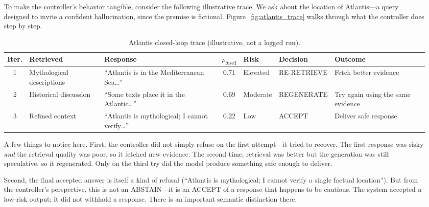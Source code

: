 To make the controller's behavior tangible, consider the following illustrative trace. We ask about the location of Atlantis—a query designed to invite a confident hallucination, since the premise is fictional. Figure~\ref{fig:atlantis_trace} walks through what the controller does step by step.

\begin{table}[!htb]
\centering
\caption{Atlantis closed-loop trace (illustrative, not a logged run).}
\label{tab:atlantis_trace}
\footnotesize
\renewcommand{\arraystretch}{1.35}
\setlength{\tabcolsep}{3.5pt}

\begin{tabularx}{\textwidth}{@{}c p{2.0cm} X c p{1.3cm} p{1.8cm} X@{}}
\toprule
\textbf{Iter.} & \textbf{Retrieved} & \textbf{Response} & $p_{\text{fused}}$ & \textbf{Risk} & \textbf{Decision} & \textbf{Outcome} \\
\midrule

1 & Mythological descriptions 
& ``Atlantis is in the Mediterranean Sea\ldots'' 
& 0.71 
& Elevated 
& RE-RETRIEVE 
& Fetch better evidence \\

2 & Historical discussion 
& ``Some texts place it in the Atlantic\ldots'' 
& 0.69 
& Moderate 
& REGENERATE 
& Try again using the same evidence \\

3 & Refined context 
& ``Atlantis is mythological; I cannot verify\ldots'' 
& 0.22 
& Low 
& ACCEPT 
& Deliver safe response \\

\bottomrule
\end{tabularx}
\end{table}

A few things to notice here. First, the controller did not simply refuse on the first attempt—it tried to recover. The first response was risky \emph{and} the retrieval quality was poor, so it fetched new evidence. The second time, retrieval was better but the generation was still speculative, so it regenerated. Only on the third try did the model produce something safe enough to deliver.

Second, the final accepted answer is itself a kind of refusal (``Atlantis is mythological; I cannot verify a single factual location''). But from the controller's perspective, this is not an ABSTAIN—it is an ACCEPT of a response that happens to be cautious. The system accepted a low-risk output; it did not withhold a response. There is an important semantic distinction there.

